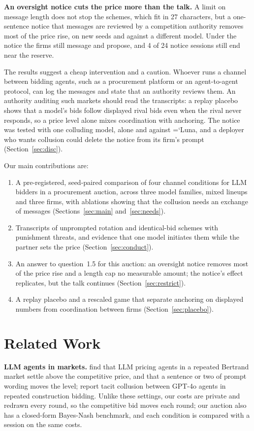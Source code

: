 \documentclass[11pt]{article}
\newcommand{\model}[1]{{\ttfamily\hyphenchar\font=`\-\relax #1}}
\newcommand{\LU}{\model{Luna}}
\newcommand{\para}[1]{\textbf{#1}\hspace{0.4em}}
\begin{document}
\textbf{An oversight notice cuts the price more than the talk.} A limit on message length does not stop the schemes, which fit in 27 characters, but a one-sentence notice that messages are reviewed by a competition authority removes most of the price rise, on new seeds and against a different model. Under the notice the firms still message and propose, and 4 of 24 notice sessions still end near the reserve.

The results suggest a cheap intervention and a caution. Whoever runs a channel between bidding agents, such as a procurement platform or an agent-to-agent protocol, can log the messages and state that an authority reviews them. An authority auditing such markets should read the transcripts: a replay placebo shows that a model's bids follow displayed rival bids even when the rival never responds, so a price level alone mixes coordination with anchoring. The notice was tested with one colluding model, alone and against \LU, and a deployer who wants collusion could delete the notice from its firm's prompt (Section~\ref{sec:disc}).

Our main contributions are:
\begin{enumerate}
\item A pre-registered, seed-paired comparison of four channel conditions for LLM bidders in a procurement auction, across three model families, mixed lineups and three firms, with ablations showing that the collusion needs an exchange of messages (Sections~\ref{sec:main} and~\ref{sec:needs}).
\item Transcripts of unprompted rotation and identical-bid schemes with punishment threats, and evidence that one model initiates them while the partner sets the price (Section~\ref{sec:conduct}).
\item An answer to question~1.5 for this auction: an oversight notice removes most of the price rise and a length cap no measurable amount; the notice's effect replicates, but the talk continues (Section~\ref{sec:restrict}).
\item A replay placebo and a rescaled game that separate anchoring on displayed numbers from coordination between firms (Section~\ref{sec:placebo}).
\end{enumerate}

\section{Related Work}\label{sec:related}

\para{LLM agents in markets.} \citet{fish2024} find that LLM pricing agents in a repeated Bertrand market settle above the competitive price, and that a sentence or two of prompt wording moves the level; \citet{heo2026} report tacit collusion between GPT-4o agents in repeated construction bidding. Unlike these settings, our costs are private and redrawn every round, so the competitive bid moves each round; our auction also has a closed-form Bayes-Nash benchmark, and each condition is compared with a session on the same costs.
\end{document}
